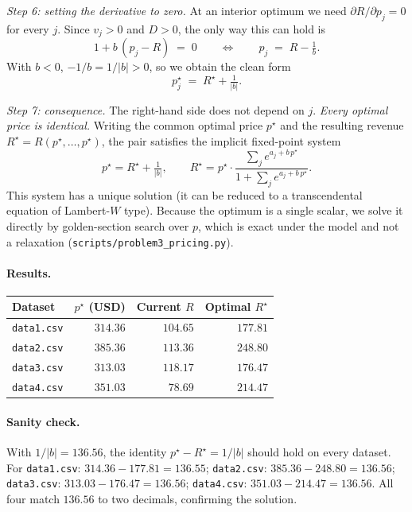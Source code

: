 \documentclass[11pt]{article}
\begin{document}
\textit{Step 6: setting the derivative to zero.}
At an interior optimum we need $\partial R/\partial p_j = 0$ for every $j$.
Since $v_j > 0$ and $D > 0$, the only way this can hold is
\[
1 + b\,(p_j - R) \;=\; 0
\qquad\Longleftrightarrow\qquad
p_j \;=\; R - \tfrac{1}{b}.
\]
With $b < 0$, $-1/b = 1/|b| > 0$, so we obtain the clean form
\[
\boxed{\;p_j^\star \;=\; R^\star + \tfrac{1}{|b|}.\;}
\]

\textit{Step 7: consequence.}
The right-hand side does not depend on $j$. \emph{Every optimal price is
identical.} Writing the common optimal price $p^\star$ and the resulting
revenue $R^\star = R(p^\star,\dots,p^\star)$, the pair satisfies the
implicit fixed-point system
\[
p^\star = R^\star + \tfrac{1}{|b|},
\qquad
R^\star = p^\star \cdot
  \frac{\sum_j e^{a_j + b\, p^\star}}{1 + \sum_j e^{a_j + b\, p^\star}}.
\]
This system has a unique solution (it can be reduced to a transcendental
equation of Lambert-$W$ type). Because the optimum is a single scalar,
we solve it directly by golden-section search over $p$, which is exact
under the model and not a relaxation
(\texttt{scripts/problem3\_pricing.py}).

\paragraph{Results.}
\begin{center}
\begin{tabular}{lrrr}
\toprule
Dataset & $p^\star$ (USD) & Current $R$ & Optimal $R^\star$ \\
\midrule
\texttt{data1.csv} & $314.36$ & $104.65$ & $177.81$ \\
\texttt{data2.csv} & $385.36$ & $113.36$ & $248.80$ \\
\texttt{data3.csv} & $313.03$ & $118.17$ & $176.47$ \\
\texttt{data4.csv} & $351.03$ & $\phantom{0}78.69$  & $214.47$ \\
\bottomrule
\end{tabular}
\end{center}

\paragraph{Sanity check.}
With $1/|b| = 136.56$, the identity $p^\star - R^\star = 1/|b|$ should hold
on every dataset. For \texttt{data1.csv}: $314.36-177.81=136.55$;
\texttt{data2.csv}: $385.36-248.80=136.56$; \texttt{data3.csv}:
$313.03-176.47=136.56$; \texttt{data4.csv}: $351.03-214.47=136.56$.
All four match $136.56$ to two decimals, confirming the solution.
\end{document}
